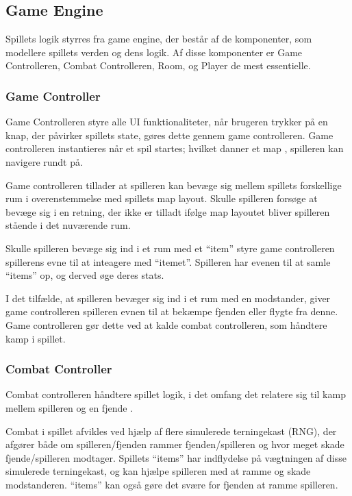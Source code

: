\subsection{Game Engine}
\label{sec:GameEngineDesign}

\noindent Spillets logik styrres fra game engine, der består
af de komponenter, som modellere spillets verden og dens 
logik. Af disse komponenter er Game Controlleren, Combat Controlleren,
Room, og Player de mest essentielle.

\subsubsection{Game Controller}
Game Controlleren styre alle UI funktionaliteter, når brugeren
trykker på en knap, der påvirker spillets state, gøres dette
gennem game controlleren. Game controlleren instantieres når
et spil startes; hvilket danner et map \parencite[Section 10.3.1][]
{TekniskBilag}, spilleren kan navigere rundt på. 

Game controlleren tillader at spilleren kan bevæge sig mellem
spillets forskellige rum \parencite[Section 9.3.1][]{TekniskBilag} 
i overenstemmelse med spillets map layout. Skulle spilleren forsøge at
bevæge sig i en retning, der ikke er tilladt ifølge map layoutet bliver 
spilleren stående i det nuværende rum.

Skulle spilleren bevæge sig ind i et rum med et ``item'' styre 
game controlleren spillerens evne til at inteagere med ``itemet''.
Spilleren har evenen til at samle ``items'' op, og derved øge deres
stats.

I det tilfælde, at spilleren bevæger sig ind i et rum med en modstander,
giver game controlleren spilleren evnen til at bekæmpe fjenden eller
flygte fra denne. Game controlleren gør dette ved at kalde combat controlleren,
som håndtere kamp i spillet.

\subsubsection{Combat Controller}
Combat controlleren håndtere spillet logik, i det omfang det relatere sig til
kamp mellem spilleren og en fjende \parencite[Section 9.3.3][Figur 17]{TekniskBilag}.

Combat i spillet afvikles ved hjælp af flere simulerede terningekast (RNG), der
afgører både om spilleren/fjenden rammer fjenden/spilleren og hvor meget skade
fjende/spilleren modtager. Spillets ``items'' har indflydelse på vægtningen af
disse simulerede terningekast, og kan hjælpe spilleren med at ramme og skade 
modstanderen. ``items'' kan også gøre det svære for fjenden at ramme spilleren.

